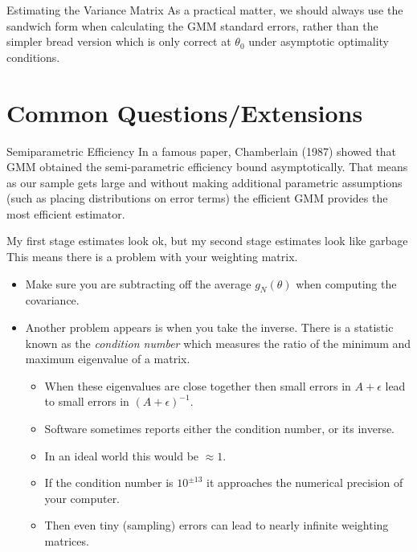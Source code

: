 \documentclass[aspectratio=169]{beamer}
\begin{document}
\begin{frame}{Estimating the Variance Matrix}
 As a practical matter, we should always use the \alert{sandwich} form when calculating the GMM standard errors, rather than the simpler \alert{bread} version which is only correct at $\theta_0$ under asymptotic optimality conditions.
\end{frame}

\section*{\normalsize  Common Questions/Extensions}

\begin{frame}{Semiparametric Efficiency}
In a famous paper, Chamberlain (1987) showed that GMM obtained the semi-parametric efficiency bound asymptotically. That means as our sample gets large and without making additional parametric assumptions (such as placing distributions on error terms) the efficient GMM provides the most efficient estimator.
\end{frame}

\begin{frame}{My first stage estimates look ok, but my second stage estimates look like garbage}
This means there is a problem with your weighting matrix. 
\begin{itemize}
\item Make sure you are subtracting off the average $g_N(\theta)$ when computing the covariance. 
\item Another problem appears is when you take the inverse. There is a statistic known as the \textit{condition number} which measures the ratio of the minimum and maximum eigenvalue of a matrix.
\begin{itemize}
\item When these eigenvalues are close together then small errors in $A+\epsilon$ lead to small errors in $(A+\epsilon)^{-1}$.
\item Software sometimes reports either the condition number, or its inverse.
\item In an ideal world this would be $\approx 1$. 
\item If the condition number is $10^{\pm 13}$ it approaches the numerical precision of your computer. 
\item Then even tiny (sampling) errors can lead to nearly infinite weighting matrices.
\end{itemize}
\end{itemize}
\end{frame}
\end{document}
